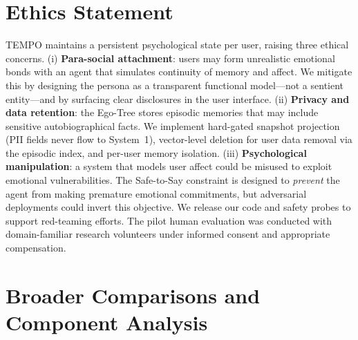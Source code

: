 \documentclass[11pt]{article}
\begin{document}
\section*{Ethics Statement}

TEMPO maintains a persistent psychological state per user, raising three ethical concerns.
(i) \textbf{Para-social attachment}: users may form unrealistic emotional bonds with an agent that simulates continuity of memory and affect.
We mitigate this by designing the persona as a transparent functional model---not a sentient entity---and by surfacing clear disclosures in the user interface.
(ii) \textbf{Privacy and data retention}: the Ego-Tree stores episodic memories that may include sensitive autobiographical facts.
We implement hard-gated snapshot projection (PII fields never flow to System~1), vector-level deletion for user data removal via the episodic index, and per-user memory isolation.
(iii) \textbf{Psychological manipulation}: a system that models user affect could be misused to exploit emotional vulnerabilities.
The Safe-to-Say constraint is designed to \emph{prevent} the agent from making premature emotional commitments, but adversarial deployments could invert this objective.
We release our code and safety probes to support red-teaming efforts.
The pilot human evaluation was conducted with domain-familiar research volunteers under informed consent and appropriate compensation.



\newpage

\appendix

\setcounter{figure}{0}
\setcounter{table}{0}
\renewcommand{\thefigure}{\thesection.\arabic{figure}}
\renewcommand{\thetable}{\thesection.\arabic{table}}

\section{Broader Comparisons and Component Analysis}
\label{app:appendix-g}
\label{app:additional-results}
\end{document}
